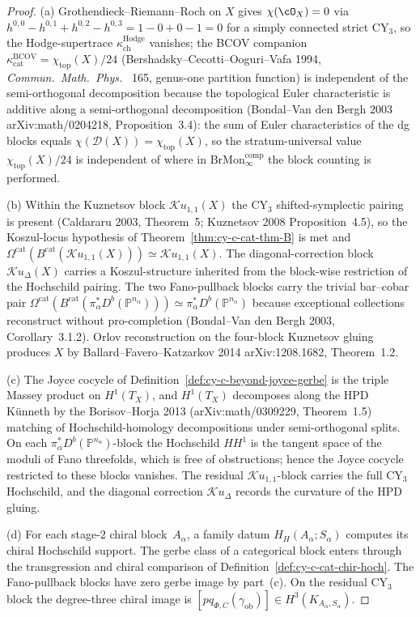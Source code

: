 \begin{proof}
(a) Grothendieck--Riemann--Roch on $X$ gives
$\chi(\cO_X) = 0$ via $h^{0,0} - h^{0,1} + h^{0,2} - h^{0,3} = 1 - 0 + 0 - 1 = 0$
for a simply connected strict CY$_3$, so the Hodge-supertrace
$\kappa_{\mathrm{ch}}^{\mathrm{Hodge}}$ vanishes; the BCOV companion
$\kappa_{\mathrm{cat}}^{\mathrm{BCOV}} = \chi_{\mathrm{top}}(X) / 24$
(Bershadsky--Cecotti--Ooguri--Vafa 1994, \emph{Commun.\ Math.\ Phys.}~
165, genus-one partition function) is independent of the
semi-orthogonal decomposition because the topological Euler
characteristic is additive along a semi-orthogonal decomposition
(Bondal--Van den Bergh 2003 arXiv:math/0204218, Proposition~3.4): the
sum of Euler characteristics of the dg blocks equals
$\chi(\mathcal D(X)) = \chi_{\mathrm{top}}(X)$, so
the stratum-universal value $\chi_{\mathrm{top}}(X)/24$ is
independent of where in $\mathrm{BrMon}^{\mathrm{comp}}_\infty$ the
block counting is performed.

(b) Within the Kuznetsov block $\mathcal{K}u_{1,1}(X)$ the CY$_3$
shifted-symplectic pairing is present (Caldararu 2003, Theorem~5;
Kuznetsov 2008 Proposition~4.5), so the Koszul-locus hypothesis of
Theorem~\ref{thm:cy-c-cat-thm-B} is met and
$\Omega^{\mathrm{cat}}(B^{\mathrm{cat}}(\mathcal{K}u_{1,1}(X))) \simeq
\mathcal{K}u_{1,1}(X)$. The diagonal-correction block
$\mathcal{K}u_\Delta(X)$ carries a Koszul-structure inherited from
the block-wise restriction of the Hochschild pairing. The two
Fano-pullback blocks carry the trivial bar--cobar pair
$\Omega^{\mathrm{cat}}(B^{\mathrm{cat}}(\pi_\alpha^* D^b(\mathbb P^{n_\alpha}))) \simeq
\pi_\alpha^* D^b(\mathbb P^{n_\alpha})$ because exceptional
collections reconstruct without pro-completion
(Bondal--Van den Bergh 2003, Corollary~3.1.2). Orlov reconstruction
on the four-block Kuznetsov gluing produces $X$ by Ballard--Favero--Katzarkov
2014 arXiv:1208.1682, Theorem~1.2.

(c) The Joyce cocycle of Definition~\ref{def:cy-c-beyond-joyce-gerbe}
is the triple Massey product on $H^1(T_X)$, and
$H^1(T_X)$ decomposes along the HPD Künneth by the
Borisov--Horja 2013 (arXiv:math/0309229, Theorem~1.5) matching of
Hochschild-homology decompositions under semi-orthogonal splits. On
each $\pi_\alpha^* D^b(\mathbb P^{n_\alpha})$-block the Hochschild
$HH^1$ is the tangent space of the moduli of Fano threefolds, which
is free of obstructions; hence the Joyce cocycle restricted to these
blocks vanishes. The residual $\mathcal{K}u_{1,1}$-block carries the
full CY$_3$ Hochschild, and the diagonal correction
$\mathcal{K}u_\Delta$ records the curvature of the HPD gluing.

(d) For each stage-$2$ chiral block~$A_\alpha$, a family datum
$H_H(A_\alpha;S_\alpha)$ computes its chiral Hochschild support.
The gerbe class of a categorical block enters through the
transgression and chiral comparison of
Definition~\ref{def:cy-c-cat-chir-hoch}.  The Fano-pullback blocks
have zero gerbe image by part~(c).  On the residual CY$_3$ block the
degree-three chiral image is
$[p q_{\Phi,C}(\gamma_{\mathrm{ob}})]\in
H^3(K_{A_\alpha,S_\alpha})$.
\end{proof}

